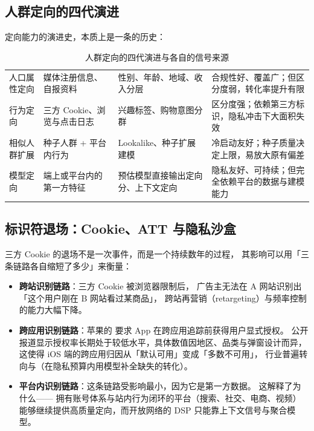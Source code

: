 \subsection{人群定向的四代演进}

定向能力的演进史，本质上是一条的历史：

\begin{table}[htbp]
\centering
\caption{人群定向的四代演进与各自的信号来源}
\label{tab:targeting-evolution}
\small
\begin{tabularx}{\textwidth}{L{2.3cm} L{3.2cm} L{2.6cm} Y}
\toprule
{} &  &  &  \\
\midrule
人口属性定向 & 媒体注册信息、自报资料 & 性别、年龄、地域、收入分层 & 合规性好、覆盖广；但区分度弱，转化率提升有限 \\
\addlinespace
行为定向 & 三方 Cookie、浏览与点击日志 & 兴趣标签、购物意图分群 & 区分度强；依赖第三方标识，隐私冲击下大面积失效 \\
\addlinespace
相似人群扩展 & 种子人群 + 平台内行为 & Lookalike、种子扩展建模 & 冷启动友好；种子质量决定上限，易放大原有偏差 \\
\addlinespace
模型定向 & 端上或平台内的第一方特征 & 预估模型直接输出定向分、上下文定向 & 隐私友好、可持续；但完全依赖平台的数据与建模能力 \\
\bottomrule
\end{tabularx}
\end{table}

\subsection{标识符退场：Cookie、ATT 与隐私沙盒}

三方 Cookie 的退场不是一次事件，而是一个持续数年的过程，
其影响可以用「三条链路各自缩短了多少」来衡量：

\begin{itemize}
  \item \textbf{跨站识别链路}：三方 Cookie 被浏览器限制后，
        广告主无法在 A 网站识别出「这个用户刚在 B 网站看过某商品」，
        跨站再营销（retargeting）与频率控制的能力大幅下降。
  \item \textbf{跨应用识别链路}：苹果的
        要求 App 在跨应用追踪前获得用户显式授权。
        公开报道显示授权率长期处于较低水平，具体数值因地区、品类与弹窗设计而异，
        这使得 iOS 端的跨应用归因从「默认可用」变成「多数不可用」，
        行业普遍转向与（在隐私预算内用模型补全缺失的转化）。
  \item \textbf{平台内识别链路}：这条链路受影响最小，因为它是第一方数据。
        这解释了为什么——
        拥有账号体系与站内行为闭环的平台（搜索、社交、电商、视频）
        能够继续提供高质量定向，而开放网络的 DSP 只能靠上下文信号与聚合模型。
\end{itemize}

